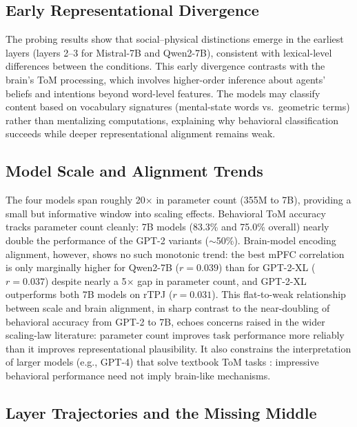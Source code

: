 \documentclass[conference]{IEEEtran}
\begin{document}
\subsection{Early Representational Divergence}

The probing results show that social--physical distinctions emerge in the earliest layers (layers 2--3 for Mistral-7B and Qwen2-7B), consistent with lexical-level differences between the conditions. This early divergence contrasts with the brain's ToM processing, which involves higher-order inference about agents' beliefs and intentions beyond word-level features. The models may classify content based on vocabulary signatures (mental-state words vs.\ geometric terms) rather than mentalizing computations, explaining why behavioral classification succeeds while deeper representational alignment remains weak.

\subsection{Model Scale and Alignment Trends}

The four models span roughly 20$\times$ in parameter count (355M to 7B), providing a small but informative window into scaling effects. Behavioral ToM accuracy tracks parameter count cleanly: 7B models (83.3\% and 75.0\% overall) nearly double the performance of the GPT-2 variants ($\sim$50\%). Brain-model encoding alignment, however, shows no such monotonic trend: the best mPFC correlation is only marginally higher for Qwen2-7B ($r = 0.039$) than for GPT-2-XL ($r = 0.037$) despite nearly a 5$\times$ gap in parameter count, and GPT-2-XL outperforms both 7B models on rTPJ ($r = 0.031$). This flat-to-weak relationship between scale and brain alignment, in sharp contrast to the near-doubling of behavioral accuracy from GPT-2 to 7B, echoes concerns raised in the wider scaling-law literature: parameter count improves task performance more reliably than it improves representational plausibility. It also constrains the interpretation of larger models (e.g., GPT-4) that solve textbook ToM tasks \cite{kosinski2024evaluating, strachan2024testing}: impressive behavioral performance need not imply brain-like mechanisms.

\subsection{Layer Trajectories and the Missing Middle}
\end{document}
